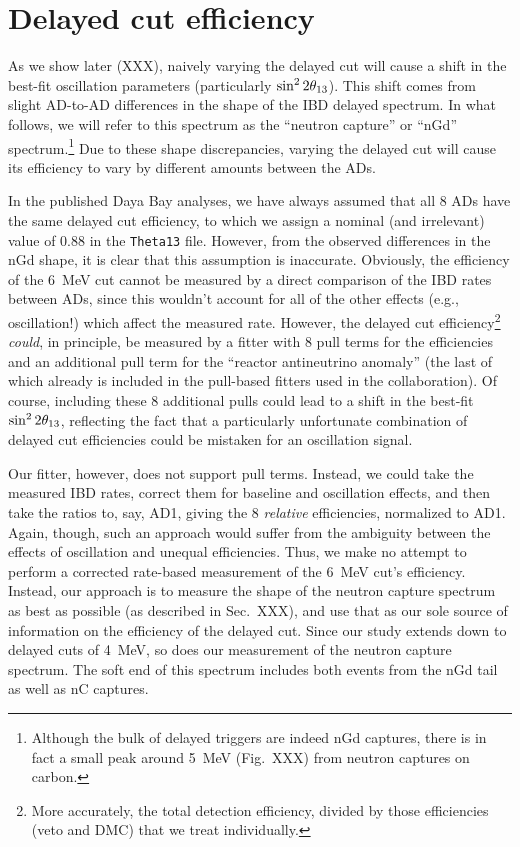 \documentclass[../thesis.tex]{subfiles}
\begin{document}
\section{Delayed cut efficiency}
\label{sec:cutVaryDelCutEff}

As we show later (XXX), naively varying the delayed cut will cause a shift in the best-fit oscillation parameters (particularly $\sin^2 2\theta_{13}$). This shift comes from slight AD-to-AD differences in the shape of the IBD delayed spectrum. In what follows, we will refer to this spectrum as the ``neutron capture'' or ``nGd'' spectrum.\footnote{Although the bulk of delayed triggers are indeed nGd captures, there is in fact a small peak around 5~MeV (Fig.~XXX) from neutron captures on carbon.} Due to these shape discrepancies, varying the delayed cut will cause its efficiency to vary by different amounts between the ADs.

In the published Daya Bay analyses, we have always assumed that all 8 ADs have the same delayed cut efficiency, to which we assign a nominal (and irrelevant) value of 0.88 in the \texttt{Theta13} file. However, from the observed differences in the nGd shape, it is clear that this assumption is inaccurate. Obviously, the efficiency of the 6~MeV cut cannot be measured by a direct comparison of the IBD rates between ADs, since this wouldn't account for all of the other effects (e.g., oscillation!) which affect the measured rate. However, the delayed cut efficiency\footnote{More accurately, the total detection efficiency, divided by those efficiencies (veto and DMC) that we treat individually.} \emph{could}, in principle, be measured by a fitter with 8 pull terms for the efficiencies and an additional pull term for the ``reactor antineutrino anomaly'' (the last of which already is included in the pull-based fitters used in the collaboration). Of course, including these 8 additional pulls could lead to a shift in the best-fit $\sin^2 2\theta_{13}$, reflecting the fact that a particularly unfortunate combination of delayed cut efficiencies could be mistaken for an oscillation signal.

Our fitter, however, does not support pull terms. Instead, we could take the measured IBD rates, correct them for baseline and oscillation effects, and then take the ratios to, say, AD1, giving the 8 \emph{relative} efficiencies, normalized to AD1. Again, though, such an approach would suffer from the ambiguity between the effects of oscillation and unequal efficiencies. Thus, we make no attempt to perform a corrected rate-based measurement of the 6~MeV cut's efficiency. Instead, our approach is to measure the shape of the neutron capture spectrum as best as possible (as described in Sec.~XXX), and use that as our sole source of information on the efficiency of the delayed cut. Since our study extends down to delayed cuts of 4~MeV, so does our measurement of the neutron capture spectrum. The soft end of this spectrum includes both events from the nGd tail as well as nC captures.
\end{document}
